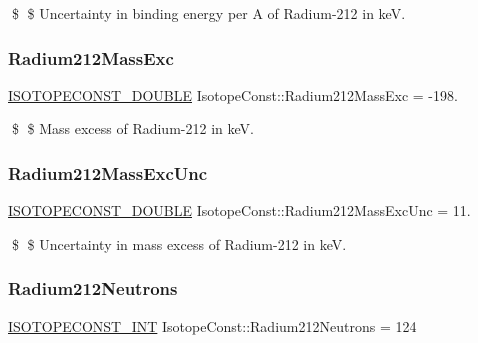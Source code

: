 \$ \$ Uncertainty in binding energy per A of Radium-\/212 in keV. \mbox{\label{group___isotope_const-_radium-_ra212_gad4e1b5e6e489b759b819a6a7df9db007}} 
\subsubsection{\texorpdfstring{Radium212\+Mass\+Exc}{Radium212MassExc}}
{\footnotesize\ttfamily \mbox{\hyperlink{group___isotope_const-_macros_ga8f45a7272ce02c0b4c65c44636ed719a}{I\+S\+O\+T\+O\+P\+E\+C\+O\+N\+S\+T\+\_\+\+D\+O\+U\+B\+LE}} Isotope\+Const\+::\+Radium212\+Mass\+Exc = -\/198.}

\$ \$ Mass excess of Radium-\/212 in keV. \mbox{\label{group___isotope_const-_radium-_ra212_ga208c0f9936a7fbf301721e7917d8f9de}} 
\subsubsection{\texorpdfstring{Radium212\+Mass\+Exc\+Unc}{Radium212MassExcUnc}}
{\footnotesize\ttfamily \mbox{\hyperlink{group___isotope_const-_macros_ga8f45a7272ce02c0b4c65c44636ed719a}{I\+S\+O\+T\+O\+P\+E\+C\+O\+N\+S\+T\+\_\+\+D\+O\+U\+B\+LE}} Isotope\+Const\+::\+Radium212\+Mass\+Exc\+Unc = 11.}

\$ \$ Uncertainty in mass excess of Radium-\/212 in keV. \mbox{\label{group___isotope_const-_radium-_ra212_ga64293602354152f787a1f9d861ac43f2}} 
\subsubsection{\texorpdfstring{Radium212\+Neutrons}{Radium212Neutrons}}
{\footnotesize\ttfamily \mbox{\hyperlink{group___isotope_const-_macros_ga5f18360b3e99483a35c32d789e62621c}{I\+S\+O\+T\+O\+P\+E\+C\+O\+N\+S\+T\+\_\+\+I\+NT}} Isotope\+Const\+::\+Radium212\+Neutrons = 124}

